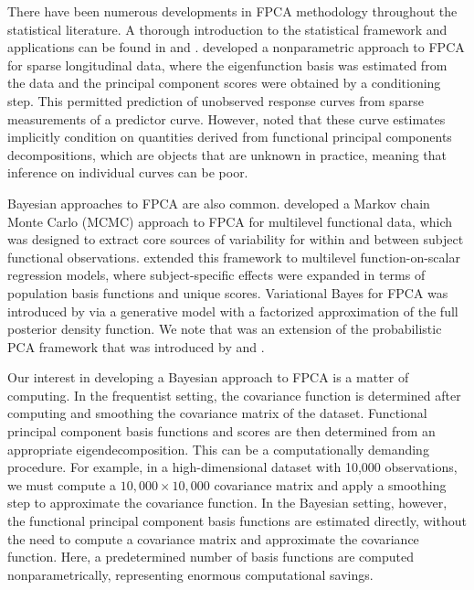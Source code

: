 \documentclass[12pt]{article}
\theoremstyle{plain}
\theoremstyle{definition}
\theoremstyle{remark}
\begin{document}
There have been numerous developments in FPCA methodology throughout the statistical literature.
A thorough introduction to the statistical framework and applications can be found in 
and .  developed a nonparametric approach to FPCA
for sparse longitudinal data, where the eigenfunction basis was estimated from the data and the
principal component scores were obtained by a conditioning step. This permitted
prediction of unobserved response curves from sparse measurements of a predictor curve. However,
 noted that these curve estimates implicitly condition on quantities derived from functional
principal components decompositions, which are objects that are unknown in practice, meaning that inference on
individual curves can be poor.

Bayesian approaches to FPCA are also common.  developed a Markov chain Monte Carlo (MCMC)
approach to FPCA for multilevel functional data, which was designed to extract core sources of variability for within and
between subject functional observations.  extended this framework to multilevel function-on-scalar
regression models, where subject-specific effects were expanded in terms of population basis functions and unique
scores. Variational Bayes for FPCA was introduced by  via a generative model with a
factorized approximation of the full posterior density function. We note that  was an extension
of the probabilistic PCA framework that was introduced by  and .

Our interest in developing a Bayesian approach to FPCA is a matter of computing. In the frequentist setting,
the covariance function is determined after computing and smoothing the covariance matrix of the dataset.
Functional principal component basis functions and scores are then determined from an appropriate
eigendecomposition. This can be a computationally demanding procedure. For example,
in a high-dimensional dataset with 10,000 observations, we must compute a $10,000 \times 10,000$
covariance matrix and apply a smoothing step to approximate the covariance function.
In the Bayesian setting, however, the functional principal component basis functions are estimated directly,
without the need to compute a covariance matrix and approximate the covariance function.
Here, a predetermined number of basis functions are computed nonparametrically, representing
enormous computational savings.
\end{document}
